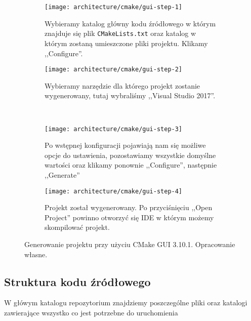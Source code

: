 \documentclass[../main.tex]{subfiles}
\begin{document}
\begin{figure}
    \centering
    
    \begin{subfigure}[t]{0.40\textwidth}
        \texttt{[image: architecture/cmake/gui-step-1]}
        \caption{Wybieramy katalog główny kodu źródłowego w którym znajduje się plik \texttt{CMakeLists.txt} oraz katalog w którym zostaną umieszczone pliki projektu. Klikamy ,,Configure''.}
    \end{subfigure}
    \hspace{0.5cm}
    \begin{subfigure}[t]{0.40\textwidth}
        \centering
        \texttt{[image: architecture/cmake/gui-step-2]}
        \caption{Wybieramy narzędzie dla którego projekt zostanie wygenerowany, tutaj wybraliśmy ,,Visual Studio 2017''.}
    \end{subfigure}

    \hfill \\ 
    \vspace{0.5cm}

    \begin{subfigure}[t]{0.40\textwidth}
        \centering
        \texttt{[image: architecture/cmake/gui-step-3]}
        \caption{Po wstępnej konfiguracji pojawiają nam się możliwe opcje do ustawienia, pozostawiamy wszystkie domyślne wartości oraz klikamy ponownie ,,Configure'', następnie ,,Generate''}
    \end{subfigure}
    \hspace{0.5cm}
    \begin{subfigure}[t]{0.40\textwidth}
        \centering
        \texttt{[image: architecture/cmake/gui-step-4]}
        \caption{Projekt został wygenerowany. Po przyciśnięciu ,,Open Project'' powinno otworzyć się IDE w którym możemy skompilować projekt.}
    \end{subfigure}
    
    \caption{Generowanie projektu przy użyciu CMake GUI 3.10.1. Opracowanie własne.}
    \label{fig:CMakeGUIUsage}
\end{figure}


\subsection{Struktura kodu źródłowego}

W główym katalogu repozytorium znajdziemy poszczególne pliki oraz katalogi zawierające wszystko co jest potrzebne do uruchomienia 
\end{document}
